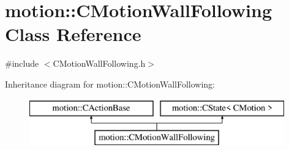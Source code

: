 \hypertarget{classmotion_1_1CMotionWallFollowing}{}\section{motion\+:\+:C\+Motion\+Wall\+Following Class Reference}
\label{classmotion_1_1CMotionWallFollowing}


{\ttfamily \#include $<$C\+Motion\+Wall\+Following.\+h$>$}

Inheritance diagram for motion\+:\+:C\+Motion\+Wall\+Following\+:\begin{figure}[H]
\begin{center}
\leavevmode
\includegraphics[height=2.000000cm]{classmotion_1_1CMotionWallFollowing}
\end{center}
\end{figure}
